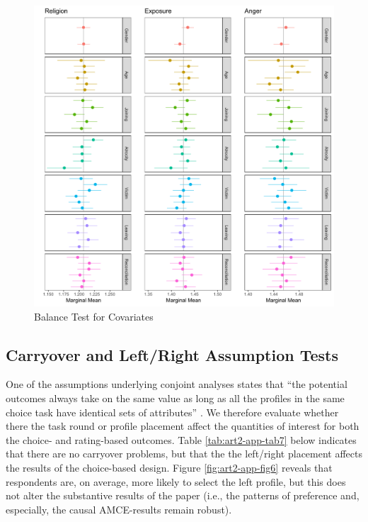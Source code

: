 \begin{figure}[H]
\centering
\includegraphics[width=\textwidth]{Appendices/Appendix_chapter_3/art2-app-figure5.pdf}
\caption{Balance Test for Covariates}
\label{fig:art2-app-fig5}
\end{figure}

\newpage
\subsection{Carryover and Left/Right Assumption Tests}
One of the assumptions underlying conjoint analyses states that ``the potential outcomes always take on the same value as long as all the profiles in the same choice task have identical sets of attributes'' \citep[][p. 8]{Hainmueller2014}. We therefore evaluate whether there the task round or profile placement affect the quantities of interest for both the choice- and rating-based outcomes. Table \ref{tab:art2-app-tab7} below indicates that there are no carryover problems, but that the the left/right placement affects the results of the choice-based design. Figure \ref{fig:art2-app-fig6} reveals that respondents are, on average, more likely to select the left profile, but this does not alter the substantive results of the paper (i.e., the patterns of preference and, especially, the causal AMCE-results remain robust).


